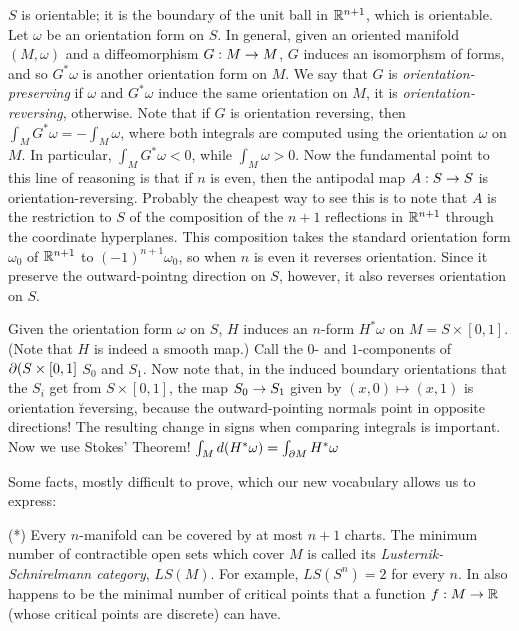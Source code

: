 $S$ is orientable; it is the boundary of the unit ball in ${\Bbb R}^{n+1}$, which is
orientable. Let $\omega$ be an orientation form on $S$. In general, given 
an oriented manifold $(M,\omega)$ and a diffeomorphism $G:M\rightarrow M$,
$G$ induces an isomorphsm of forms, and so $G^*\omega$ is another orientation
form on $M$. We say that $G$ is {\it orientation-preserving} if $\omega$ and $G^*\omega$ induce
the same orientation on $M$, it is {\it orientation-reversing}, otherwise. Note that if
$G$ is orientation reversing, then $\int_MG^*\omega=-\int_M\omega$, where both integrals
are computed using the orientation $\omega$ on $M$. In particular, $\int_MG^*\omega<0$, while
$\int_M\omega>0$. Now the fundamental point to this line of reasoning is that if $n$ is even, 
then the antipodal map $A:S\rightarrow S$ is orientation-reversing. Probably the cheapest way to see this 
is to note that $A$ is the restriction to $S$ of the composition of the
$n+1$ reflections in ${\Bbb R}^{n+1}$ through the coordinate hyperplanes. This composition
takes the standard orientation form $\omega_0$ of ${\Bbb R}^{n+1}$ to $(-1)^{n+1}\omega_0$,
so when $n$ is even it reverses orientation. Since it preserve the outward-pointng direction
on $S$, however, it also reverses orientation on $S$.

Given the orientation form $\omega$ on $S$, $H$ induces 
an $n$-form $H^*\omega$ on $M=S\times [0,1]$. (Note that $H$ is indeed a smooth map.) 
Call the $0$- and $1$-components of $\partial(S\times [0,1]$ $S_0$ and $S_1$.
Now note that, in the induced boundary orientations that the $S_i$ get from $S\times [0,1]$, 
the map $S_0\rightarrow S_1$ given by $(x,0)\mapsto(x,1)$ is orientation \u{reversing}, because the 
outward-pointing normals point in opposite directions! The resulting change in signs when 
comparing integrals is important. Now we use Stokes' Theorem! 
$\int_M d(H^*\omega)=\int_{\partial M} H^*\omega$

\bsk

\noindent Some facts, mostly difficult to prove, which our new vocabulary allows us to express:

\msk

\noindent (*) Every $n$-manifold can be covered by at most $n+1$ charts. The minimum number of contractible 
open sets which cover $M$ is
called its {\it Lusternik-Schnirelmann category}, $LS(M)$. For example, $LS(S^n)=2$ for every $n$.
In also happens to be the minimal number of critical points that a function $f:M\rightarrow {\Bbb R}$
(whose critical points are discrete) can have.

\ssk


